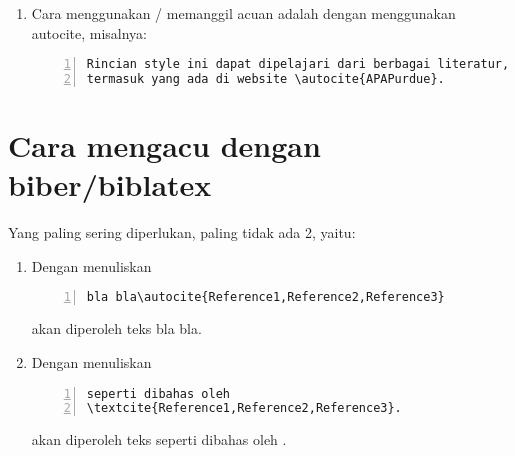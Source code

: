 \begin{enumerate}
\begin{Verbatim}[numbers=left,xleftmargin=5mm]
@article{Reference2,
	Abstract = {We present a review of the use of diode lasers in atomic physics with an extensive list of references. We discuss the relevant characteristics of diode lasers and explain how to purchase and use them. We also review the various techniques that have been used to control and narrow the spectral outputs of diode lasers. Finally we present a number of examples illustrating the use of diode lasers in atomic physics experiments. Review of Scientific Instruments is copyrighted by The American Institute of Physics.},
	Author = {Carl E. Wieman and Leo Hollberg},
	Journal = {Review of Scientific Instruments},
	Keywords = {Diode Laser},
	Month = {1},
	Number = {1},
	Numpages = {20},
	Pages = {1--20},
	Title = {Using Diode Lasers for Atomic Physics},
	Volume = {62},
	Url = {http://link.aip.org/link/?RSI/62/1/1},
	Year = {1991}}

@online{styleGuide,
author = {University Library, American University},
title = {Which style should I use ?},
Url = {http://subjectguides.library.american.edu/c.php?g=175008&p=1154150},
urldate = {2016-01-03}
}

@online{APAPurdue,
title = {Purdue Online Writing Lab},
Url = {https://owl.english.purdue.edu/owl/resource/560/1/},
urldate = {2016-01-03}
}
\end{Verbatim}

\item Cara menggunakan / memanggil acuan adalah dengan menggunakan 
autocite, misalnya:
\begin{Verbatim}[numbers=left,xleftmargin=5mm]
Rincian style ini dapat dipelajari dari berbagai literatur,
termasuk yang ada di website \autocite{APAPurdue}.
\end{Verbatim}
\end{enumerate}

\section{Cara mengacu dengan biber/biblatex}
Yang paling sering diperlukan, paling tidak ada 2, yaitu:
\begin{enumerate}
\item Dengan menuliskan
\begin{Verbatim}[numbers=left,xleftmargin=5mm]
bla bla\autocite{Reference1,Reference2,Reference3}
\end{Verbatim}
akan diperoleh teks 
bla bla\autocite{Reference1,Reference2,Reference3}.
\item Dengan menuliskan
\begin{Verbatim}[numbers=left,xleftmargin=5mm]
seperti dibahas oleh 
\textcite{Reference1,Reference2,Reference3}.
\end{Verbatim}
akan diperoleh teks
seperti dibahas oleh \textcite{Reference1,Reference2,Reference3}.
\end{enumerate}

